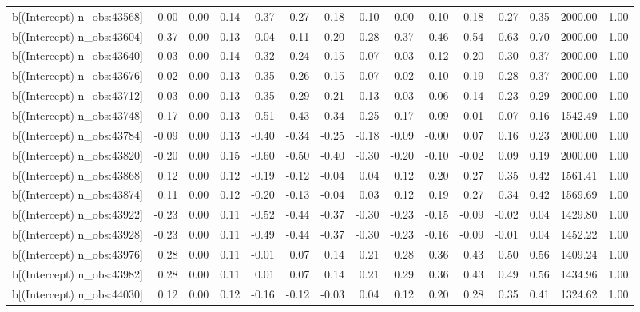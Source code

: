 \begin{table}[ht]
\begin{tabular}{rrrrrrrrrrrrrrr}
  b[(Intercept) n\_obs:43568] & -0.00 & 0.00 & 0.14 & -0.37 & -0.27 & -0.18 & -0.10 & -0.00 & 0.10 & 0.18 & 0.27 & 0.35 & 2000.00 & 1.00 \\ 
  b[(Intercept) n\_obs:43604] & 0.37 & 0.00 & 0.13 & 0.04 & 0.11 & 0.20 & 0.28 & 0.37 & 0.46 & 0.54 & 0.63 & 0.70 & 2000.00 & 1.00 \\ 
  b[(Intercept) n\_obs:43640] & 0.03 & 0.00 & 0.14 & -0.32 & -0.24 & -0.15 & -0.07 & 0.03 & 0.12 & 0.20 & 0.30 & 0.37 & 2000.00 & 1.00 \\ 
  b[(Intercept) n\_obs:43676] & 0.02 & 0.00 & 0.13 & -0.35 & -0.26 & -0.15 & -0.07 & 0.02 & 0.10 & 0.19 & 0.28 & 0.37 & 2000.00 & 1.00 \\ 
  b[(Intercept) n\_obs:43712] & -0.03 & 0.00 & 0.13 & -0.35 & -0.29 & -0.21 & -0.13 & -0.03 & 0.06 & 0.14 & 0.23 & 0.29 & 2000.00 & 1.00 \\ 
  b[(Intercept) n\_obs:43748] & -0.17 & 0.00 & 0.13 & -0.51 & -0.43 & -0.34 & -0.25 & -0.17 & -0.09 & -0.01 & 0.07 & 0.16 & 1542.49 & 1.00 \\ 
  b[(Intercept) n\_obs:43784] & -0.09 & 0.00 & 0.13 & -0.40 & -0.34 & -0.25 & -0.18 & -0.09 & -0.00 & 0.07 & 0.16 & 0.23 & 2000.00 & 1.00 \\ 
  b[(Intercept) n\_obs:43820] & -0.20 & 0.00 & 0.15 & -0.60 & -0.50 & -0.40 & -0.30 & -0.20 & -0.10 & -0.02 & 0.09 & 0.19 & 2000.00 & 1.00 \\ 
  b[(Intercept) n\_obs:43868] & 0.12 & 0.00 & 0.12 & -0.19 & -0.12 & -0.04 & 0.04 & 0.12 & 0.20 & 0.27 & 0.35 & 0.42 & 1561.41 & 1.00 \\ 
  b[(Intercept) n\_obs:43874] & 0.11 & 0.00 & 0.12 & -0.20 & -0.13 & -0.04 & 0.03 & 0.12 & 0.19 & 0.27 & 0.34 & 0.42 & 1569.69 & 1.00 \\ 
  b[(Intercept) n\_obs:43922] & -0.23 & 0.00 & 0.11 & -0.52 & -0.44 & -0.37 & -0.30 & -0.23 & -0.15 & -0.09 & -0.02 & 0.04 & 1429.80 & 1.00 \\ 
  b[(Intercept) n\_obs:43928] & -0.23 & 0.00 & 0.11 & -0.49 & -0.44 & -0.37 & -0.30 & -0.23 & -0.16 & -0.09 & -0.01 & 0.04 & 1452.22 & 1.00 \\ 
  b[(Intercept) n\_obs:43976] & 0.28 & 0.00 & 0.11 & -0.01 & 0.07 & 0.14 & 0.21 & 0.28 & 0.36 & 0.43 & 0.50 & 0.56 & 1409.24 & 1.00 \\ 
  b[(Intercept) n\_obs:43982] & 0.28 & 0.00 & 0.11 & 0.01 & 0.07 & 0.14 & 0.21 & 0.29 & 0.36 & 0.43 & 0.49 & 0.56 & 1434.96 & 1.00 \\ 
  b[(Intercept) n\_obs:44030] & 0.12 & 0.00 & 0.12 & -0.16 & -0.12 & -0.03 & 0.04 & 0.12 & 0.20 & 0.28 & 0.35 & 0.41 & 1324.62 & 1.00 \\ 

\end{tabular}
\end{table}
